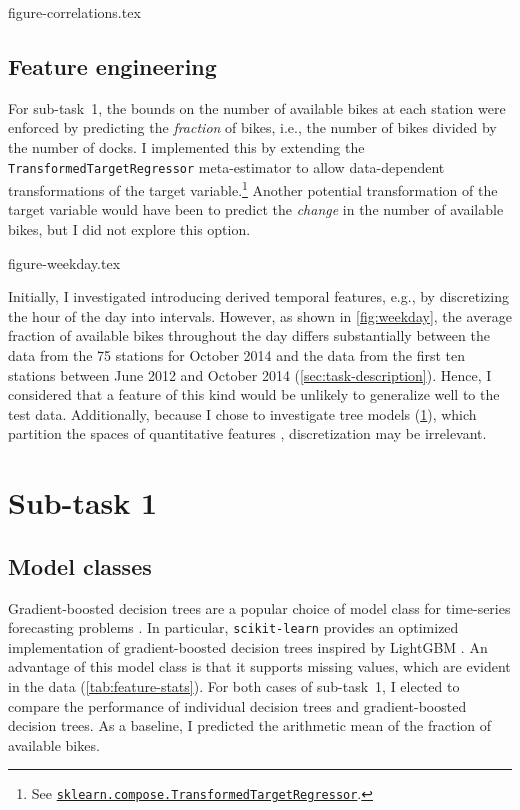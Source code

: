 \documentclass[11pt]{extarticle}
\newcommand{\sklearn}[2]{\href{https://scikit-learn.org/stable/modules/generated/sklearn.#1.#2.html}{\lstinline|sklearn.#1.#2|}}
\begin{document}
{figure-correlations.tex}

\subsection{Feature engineering}
\label{sec:feature-engineering}

For sub-task~1, the bounds on the number of available bikes at each station were
enforced by predicting the \emph{fraction} of bikes, i.e., the number of bikes divided
by the number of docks.
I implemented this by extending the \texttt{TransformedTargetRegressor} meta-estimator
to allow data-dependent transformations of the target variable.\footnote{See
  \sklearn{compose}{TransformedTargetRegressor}.
}
Another potential transformation of the target variable would have been to predict the
\emph{change} in the number of available bikes, but I did not explore this option.

{figure-weekday.tex}

Initially, I investigated introducing derived temporal features, e.g., by discretizing
the hour of the day into intervals.
However, as shown in \cref{fig:weekday}, the average fraction of available bikes
throughout the day differs substantially between the data from the 75 stations for
October 2014 and the data from the first ten stations between June 2012 and October
2014 (\cref{sec:task-description}).
Hence, I considered that a feature of this kind would be unlikely to generalize well to
the test data.
Additionally, because I chose to investigate tree models (\cref{sec:subtask-1}), which
partition the spaces of quantitative features \parencite[155]{Flach2012},
discretization may be irrelevant.

\section{Sub-task 1}
\label{sec:subtask-1}

\subsection{Model classes}
\label{sec:subtask-1:model-classes}

Gradient-boosted decision trees are a popular choice of model class for time-series
forecasting problems \parencite{Bojer2021}.
In particular, \texttt{scikit-learn} provides an optimized implementation of
gradient-boosted decision trees inspired by LightGBM \parencite{Ke2017}.
An advantage of this model class is that it supports missing values, which are evident
in the data (\cref{tab:feature-stats}).
For both cases of sub-task~1, I elected to compare the performance of individual
decision trees and gradient-boosted decision trees.
As a baseline, I predicted the arithmetic mean of the fraction of available bikes.
\end{document}

